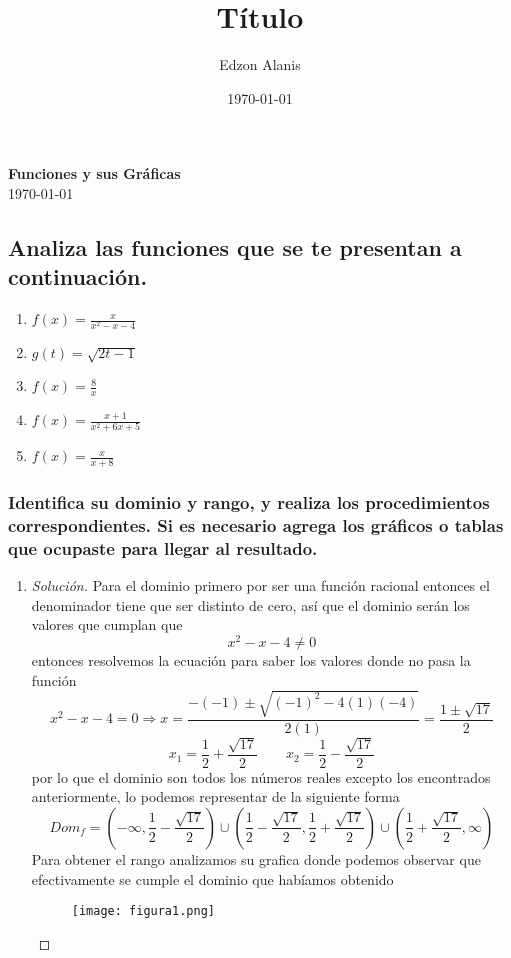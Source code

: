 \documentclass[12pt]{article}
\title{Título}
\author{Edzon Alanis}
\date{\today}
\newenvironment{solution}{\begin{proof}[Solución]}{\end{proof}}
\begin{document}
\begin{center}
    \textbf{\large Funciones y sus Gráficas} \\[0.5 cm]
    \today
\end{center}
\subsection*{Analiza las funciones que se te presentan a continuación.}

\begin{enumerate}
    \item $\displaystyle{f(x) = \frac{x}{x^2-x-4}}$
    \item $\displaystyle{g(t) = \sqrt{2t-1}}$
    \item $\displaystyle{f(x) = \frac{8}{x}}$
    \item $\displaystyle{f(x) = \frac{x+1}{x^2+6x+5}}$
    \item $\displaystyle{f(x) = \frac{x}{x+8}}$
\end{enumerate}

\subsubsection*{Identifica su dominio y rango, y realiza los procedimientos correspondientes. Si es necesario agrega los gráficos o tablas que ocupaste para llegar al resultado.}

\begin{enumerate}
    \item \begin{solution}
        Para el dominio primero por ser una función racional entonces el denominador tiene que ser distinto de cero, así que el dominio serán los valores que cumplan que \[x^2-x-4 \neq 0\] entonces resolvemos la ecuación para saber los valores donde no pasa la función
        \[x^2-x-4 = 0 \Rightarrow x = \frac{-(-1) \pm \sqrt{(-1)^2-4(1)(-4)}}{2(1)} = \frac{1 \pm \sqrt{17}}{2}\]
        \[x_1 = \frac{1}{2} + \frac{\sqrt{17}}{2} \qquad x_2 = \frac{1}{2} - \frac{\sqrt{17}}{2}\]
        por lo que el dominio son todos los números reales excepto los encontrados anteriormente, lo podemos representar de la siguiente forma
        \[Dom_f = \left(-\infty, \frac{1}{2} - \frac{\sqrt{17}}{2}\right) \cup \left(\frac{1}{2} - \frac{\sqrt{17}}{2}, \frac{1}{2} + \frac{\sqrt{17}}{2}\right) \cup \left(\frac{1}{2} + \frac{\sqrt{17}}{2}, \infty\right)\]
        Para obtener el rango analizamos su grafica donde podemos observar que efectivamente se cumple el dominio que habíamos obtenido 
        \begin{figure}[H]
            \centering
            \texttt{[image: figura1.png]}
        \end{figure}
    \end{solution}
\end{enumerate}

\end{document}
